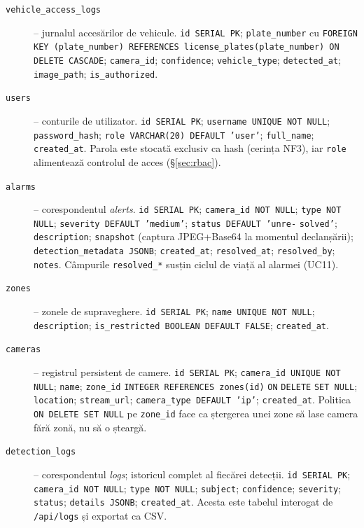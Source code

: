 \documentclass[../../main.tex]{subfiles}
\begin{document}
\begin{description}
    \item[\texttt{vehicle\_access\_logs}] -- jurnalul accesărilor de vehicule. \texttt{id SERIAL PK}; \texttt{plate\_number} cu \texttt{FOREIGN KEY (plate\_number) REFERENCES \linebreak license\_plates(plate\_number) ON DELETE CASCADE}; \texttt{camera\_id}; \linebreak \texttt{confidence}; \texttt{vehicle\_type}; \texttt{detected\_at}; \texttt{image\_path}; \linebreak \texttt{is\_authorized}.

    \item[\texttt{users}] -- conturile de utilizator. \texttt{id SERIAL PK}; \texttt{username UNIQUE NOT NULL}; \texttt{password\_hash}; \texttt{role VARCHAR(20) DEFAULT 'user'}; \texttt{full\_name}; \linebreak \texttt{created\_at}. Parola este stocată exclusiv ca hash (cerința NF3), iar \texttt{role} alimentează controlul de acces (\S\ref{sec:rbac}).

    \item[\texttt{alarms}] -- corespondentul \emph{alerts}. \texttt{id SERIAL PK}; \texttt{camera\_id NOT NULL}; \texttt{type NOT NULL}; \texttt{severity DEFAULT 'medium'}; \texttt{status DEFAULT  'unre-} \linebreak \texttt{solved'}; \texttt{description}; \texttt{snapshot} (captura JPEG+Base64 la momentul declanșării); \texttt{detection\_metadata JSONB}; \texttt{created\_at}; \texttt{resolved\_at}; \texttt{resolved\_by}; \texttt{notes}. Câmpurile \texttt{resolved\_*} susțin ciclul de viață al alarmei (UC11).

    \item[\texttt{zones}] -- zonele de supraveghere. \texttt{id SERIAL PK}; \texttt{name UNIQUE NOT NULL}; \linebreak \texttt{description}; \texttt{is\_restricted BOOLEAN DEFAULT FALSE}; \texttt{created\_at}.

    \item[\texttt{cameras}] -- registrul persistent de camere. \texttt{id SERIAL PK}; \texttt{camera\_id UNIQUE NOT NULL}; \texttt{name}; \texttt{zone\_id} \texttt{INTEGER REFERENCES zones(id)} \texttt{ON} \texttt{DELETE} \texttt{SET NULL}; \texttt{location}; \texttt{stream\_url}; \texttt{camera\_type DEFAULT 'ip'}; \linebreak \texttt{created\_at}. Politica \texttt{ON DELETE SET NULL} pe \texttt{zone\_id} face ca ștergerea unei zone să lase camera fără zonă, nu să o șteargă.

    \item[\texttt{detection\_logs}] -- corespondentul \emph{logs}; istoricul complet al fiecărei detecții. \texttt{id SERIAL PK}; \texttt{camera\_id NOT NULL}; \texttt{type NOT NULL}; \texttt{subject}; \linebreak \texttt{confidence}; \texttt{severity}; \texttt{status}; \texttt{details JSONB}; \texttt{created\_at}. Acesta este tabelul interogat de \texttt{/api/logs} și exportat ca CSV.
\end{description}
\end{document}

